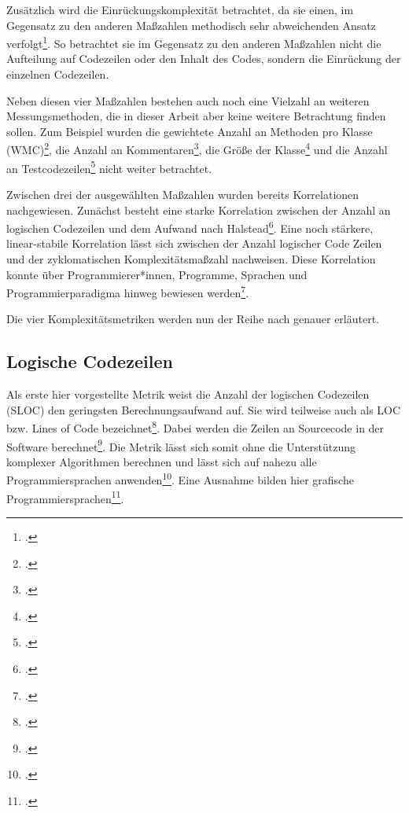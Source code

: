 Zusätzlich wird die Einrückungskomplexität betrachtet, da sie einen, im
Gegensatz zu den anderen Maßzahlen methodisch sehr abweichenden Ansatz
verfolgt\footcite[Vgl. ][]{Quelle fehlt}. So betrachtet sie im Gegensatz zu den
anderen Maßzahlen nicht die Aufteilung auf Codezeilen oder den Inhalt
des Codes, sondern die Einrückung der einzelnen Codezeilen.

Neben diesen vier Maßzahlen bestehen auch noch eine Vielzahl an weiteren
Messungsmethoden, die in dieser Arbeit aber keine weitere Betrachtung
finden sollen. Zum Beispiel wurden die gewichtete Anzahl an Methoden pro
Klasse (WMC)\footcite[Vgl. ][]{satoExperiencesTrackingAgile2006}, die Anzahl an
Kommentaren\footcite[Vgl. ][]{Revilla 2007:203}, die Größe der Klasse\footcite[Vgl. ][]{satoExperiencesTrackingAgile2006}
und die Anzahl an Testcodezeilen\footcite[Vgl. ][]{satoExperiencesTrackingAgile2006}
nicht weiter betrachtet.

Zwischen drei der ausgewählten Maßzahlen wurden bereits Korrelationen
nachgewiesen. Zunächst besteht eine starke Korrelation zwischen der
Anzahl an logischen Codezeilen und dem Aufwand nach Halstead\footcite[Vgl. ][]{Jones
  2008: 627}. Eine noch stärkere, linear-stabile Korrelation lässt sich
zwischen der Anzahl logischer Code Zeilen und der zyklomatischen
Komplexitätsmaßzahl nachweisen. Diese Korrelation konnte über
Programmierer*innen, Programme, Sprachen und Programmierparadigma hinweg
bewiesen werden\footcite[Vgl. ][]{Jones 2008:627, Jay et al 2009:137}.

Die vier Komplexitätsmetriken werden nun der Reihe nach genauer
erläutert.

\subsection{Logische Codezeilen}\label{logische-codezeilen}

Als erste hier vorgestellte Metrik weist die Anzahl der logischen
Codezeilen (SLOC) den geringsten Berechnungsaufwand auf. Sie wird
teilweise auch als LOC bzw. Lines of Code bezeichnet\footcite[Vgl. ][]{Hoffmann
  2013:263}. Dabei werden die Zeilen an Sourcecode in der Software
berechnet\footcite[Vgl. ][]{Rumreich and Kecskemety 2019:2}. Die Metrik lässt
sich somit ohne die Unterstützung komplexer Algorithmen berechnen und
lässt sich auf nahezu alle Programmiersprachen anwenden\footcite[Vgl. ][]{Hoffmann
  2013:263}. Eine Ausnahme bilden hier grafische
Programmiersprachen\footcite[Vgl. ][]{Quelle fehlt}.

